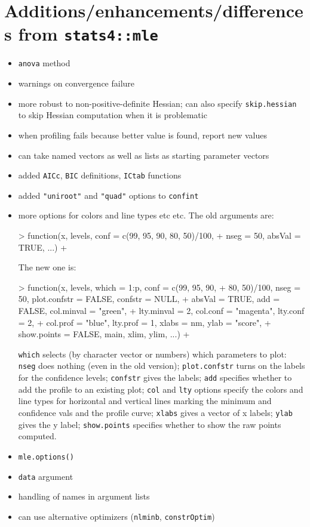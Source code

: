 \documentclass{article}
\newcommand{\code}[1]{{\tt #1}}
\begin{document}
\section*{Additions/enhancements/differences from \code{stats4::mle}}
\begin{itemize}
\item{\code{anova} method}
\item{warnings on convergence failure}
\item{more robust to non-positive-definite Hessian;
  can also specify \code{skip.hessian} to skip Hessian
  computation when it is problematic}
\item{when profiling fails because better value is
    found, report new values}
\item{can take named vectors as well as lists as
    starting parameter vectors}
\item{added \code{AICc}, \code{BIC} definitions,
    \code{ICtab} functions}
\item{added \code{"uniroot"} and \code{"quad"}
    options to \code{confint}}
\item{more options for colors and line types etc etc.
The old arguments are:
\begin{Schunk}
\begin{Sinput}
> function(x, levels, conf = c(99, 95, 90, 80, 50)/100, 
+     nseg = 50, absVal = TRUE, ...) {
+ }
\end{Sinput}
\end{Schunk}
The new one is:
\begin{Schunk}
\begin{Sinput}
> function(x, levels, which = 1:p, conf = c(99, 95, 90, 
+     80, 50)/100, nseg = 50, plot.confstr = FALSE, confstr = NULL, 
+     absVal = TRUE, add = FALSE, col.minval = "green", 
+     lty.minval = 2, col.conf = "magenta", lty.conf = 2, 
+     col.prof = "blue", lty.prof = 1, xlabs = nm, ylab = "score", 
+     show.points = FALSE, main, xlim, ylim, ...) {
+ }
\end{Sinput}
\end{Schunk}
\code{which} selects (by character vector or numbers)
which parameters to plot: \code{nseg} does nothing
(even in the old version); \code{plot.confstr} turns on
the labels for the confidence levels; \code{confstr} gives
the labels; \code{add} specifies whether to add the
profile to an existing plot; \code{col} and \code{lty}
options specify the colors and line types for
horizontal and vertical lines marking the minimum
and confidence vals and the profile curve; \code{xlabs}
gives a vector of x labels; \code{ylab} gives the y label;
\code{show.points} specifies whether to show the raw points
computed.
}
\item{\code{mle.options()}}
\item{\code{data} argument}
\item{handling of names in argument lists}
\item{can use alternative optimizers (\code{nlminb}, \code{constrOptim})}
\end{itemize}
\end{document}

